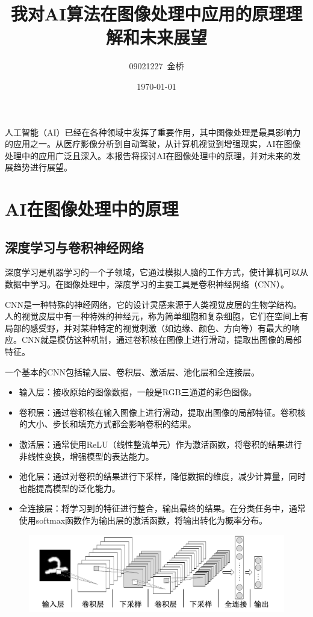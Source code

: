 \documentclass{article}
\title{我对AI算法在图像处理中应用的原理理解和未来展望}
\author{09021227~金桥}
\date{\today}
\begin{document}
\maketitle


人工智能（AI）已经在各种领域中发挥了重要作用，其中图像处理是最具影响力的应用之一。从医疗影像分析到自动驾驶，从计算机视觉到增强现实，AI在图像处理中的应用广泛且深入。本报告将探讨AI在图像处理中的原理，并对未来的发展趋势进行展望。

\section{AI在图像处理中的原理}

\subsection{深度学习与卷积神经网络}

深度学习是机器学习的一个子领域，它通过模拟人脑的工作方式，使计算机可以从数据中学习。在图像处理中，深度学习的主要工具是卷积神经网络（CNN）。

CNN是一种特殊的神经网络，它的设计灵感来源于人类视觉皮层的生物学结构。人的视觉皮层中有一种特殊的神经元，称为简单细胞和复杂细胞，它们在空间上有局部的感受野，并对某种特定的视觉刺激（如边缘、颜色、方向等）有最大的响应。CNN就是模仿这种机制，通过卷积核在图像上进行滑动，提取出图像的局部特征。

一个基本的CNN包括输入层、卷积层、激活层、池化层和全连接层。

\begin{itemize}
    \item 输入层：接收原始的图像数据，一般是RGB三通道的彩色图像。
    \item 卷积层：通过卷积核在输入图像上进行滑动，提取出图像的局部特征。卷积核的大小、步长和填充方式都会影响卷积的结果。
    \item 激活层：通常使用ReLU（线性整流单元）作为激活函数，将卷积的结果进行非线性变换，增强模型的表达能力。
    \item 池化层：通过对卷积的结果进行下采样，降低数据的维度，减少计算量，同时也能提高模型的泛化能力。
    \item 全连接层：将学习到的特征进行整合，输出最终的结果。在分类任务中，通常使用softmax函数作为输出层的激活函数，将输出转化为概率分布。
\end{itemize}

\begin{figure}[htbp]
    \centering
    \includegraphics[width=.8\linewidth]{img/CNN.png}
\end{figure}
\end{document}
